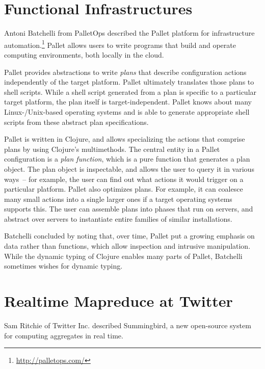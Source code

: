 \documentclass{jfp1}
\begin{document}
\section{Functional Infrastructures}

Antoni Batchelli from PalletOps described the Pallet platform for
infrastructure automation.\footnote{\url{http://palletops.com/}}
Pallet allows users to write programs that build and operate computing
environments, both locally in the cloud.  

Pallet provides abstractions to write \textit{plans} that describe
configuration actions independently of the target platform.  Pallet
ultimately translates those plans to shell scripts.  While a shell
script generated from a plan is specific to a particular target
platform, the plan itself is target-independent.  Pallet knows about
many Linux-/Unix-based operating systems and is able to generate
appropriate shell scripts from these abstract plan specifications.

Pallet is written in Clojure, and allows specializing the actions that
comprise plans by using Clojure's multimethods.  The central entity in
a Pallet configuration is a \textit{plan function}, which is a pure
function that generates a plan object.  The plan object is
inspectable, and allows the user to query it in various ways~-- for
example, the user can find out what actions it would trigger on a
particular platform.  Pallet also optimizes plans.  For example, it
can coalesce many small actions into a single larger ones if a target
operating systems supports this.  The user can assemble plans into
phases that run on servers, and abstract over servers to instantiate
entire families of similar installations.

Batchelli concluded by noting that, over time, Pallet put a growing
emphasis on data rather than functions, which allow inspection and
intrusive manipulation.  While the dynamic typing of Clojure enables
many parts of Pallet, Batchelli sometimes wishes for dynamic typing.


\section{Realtime Mapreduce at Twitter}


Sam Ritchie of Twitter Inc. described Summingbird, a new open-source
system for computing aggregates in real time.
\end{document}
